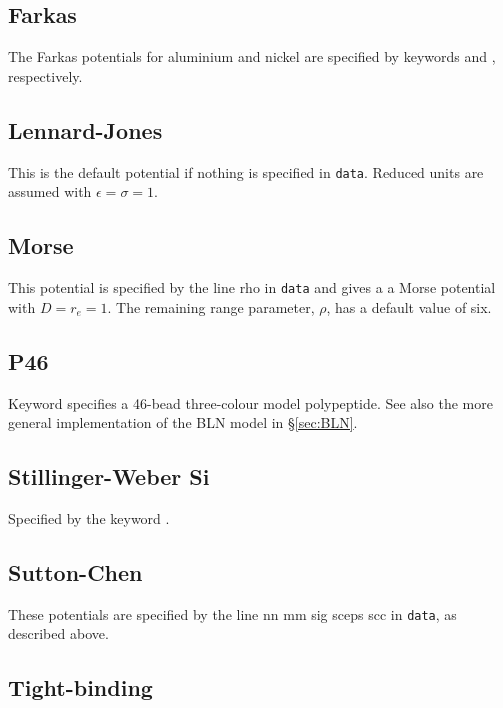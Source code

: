 {\subsection{Farkas}

The Farkas potentials for aluminium and nickel are specified by keywords {\/} and
{\/}, respectively.

\subsection{Lennard-Jones}

This is the default potential if nothing is specified in {\tt data}. Reduced units are
assumed with $\epsilon=\sigma=1$.

\subsection{Morse}

This potential is specified by the line { rho\/} in {\tt data} and gives a
a Morse potential with $D=r_e=1$. 
The remaining range parameter,\cite{braierbw90,doyewb95,doyew96a} $\rho$, has a default 
value of six.

\subsection{P46}

Keyword {\/} specifies a 46-bead three-colour model polypeptide. 
See also the more general implementation of the BLN model in \S \ref{sec:BLN}.

\subsection{Stillinger-Weber Si}

Specified by the keyword {\/}.

\subsection{Sutton-Chen}

These potentials\cite{suttonc90} are specified by the line { nn mm sig sceps scc\/} in {\tt data},
as described above. 

\subsection{Tight-binding}

}
